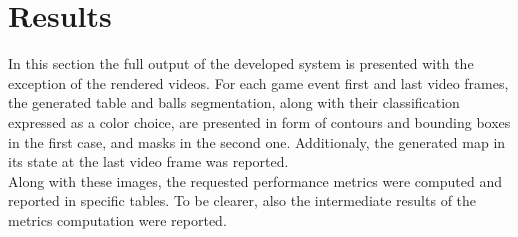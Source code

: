 \section{Results}
In this section the full output of the developed system is presented with the exception of the rendered videos.
For each game event first and last video frames, the generated table and balls segmentation, along with their classification expressed as a color choice,
are presented in form of contours and bounding boxes in the first case, and masks in the second one.
Additionaly, the generated map in its state at the last video frame was reported.
\\
Along with these images, the requested performance metrics were computed and reported in specific tables.
To be clearer, also the intermediate results of the metrics computation were reported.


